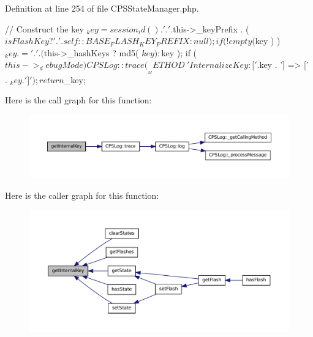 Definition at line 254 of file CPSStateManager.php.




\begin{DoxyCode}
    {
        //  Construct the key
        $_key = session_id() . '.' . $this->_keyPrefix . ( $isFlashKey ? '.' . se
      lf::BASE_FLASH_KEY_PREFIX : null );
        if ( ! empty( $key ) ) $_key .= '.' . ( $this->_hashKeys ? md5( $key ) : 
      $key );
        if ( $this->_debugMode ) CPSLog::trace( __METHOD__, 'Internalize Key:[' .
       $key . '] => [' . $_key . ']' );
        return $_key;
    }
\end{DoxyCode}




Here is the call graph for this function:\nopagebreak
\begin{figure}[H]
\begin{center}
\leavevmode
\includegraphics[width=400pt]{classCPSStateManager_aff7069e450d5b0ae178f05baeb48fa20_cgraph}
\end{center}
\end{figure}




Here is the caller graph for this function:\nopagebreak
\begin{figure}[H]
\begin{center}
\leavevmode
\includegraphics[width=400pt]{classCPSStateManager_aff7069e450d5b0ae178f05baeb48fa20_icgraph}
\end{center}
\end{figure}


